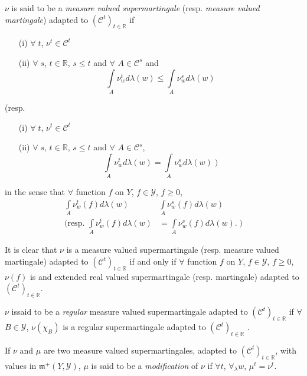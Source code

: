 \begin{defn}\label{part2:chap4:def68}
$\nu$ is said to be a {\em measure valued supermartingale} (resp. {\em
  measure valued martingale}) adapted to $(\mathscr{C}^t)_{t \in
    \mathbb{R}}$ if 
\begin{itemize}
\item[{\rm (i)}] $\forall \; t$, $\nu^t \in \mathscr{C}^t$

\item[{\rm (ii)}] $\forall \; s$, $t \in \mathbb{R}$, $s \leq t$ and
  $\forall$ $A \in \mathscr{C}^s$ and 
$$
\int\limits_A \nu^t_w d \lambda (w) \leq \int\limits_A \nu^s_w d \lambda(w)
$$
\end{itemize}
(resp.\begin{itemize}
\item[{\rm (i)}] $\forall \; t$, $\nu^t \in \mathscr{C}^t$

\item[{\rm (ii)}] $\forall \; s$, $t \in\mathbb{R}$, $s \leq t$ and
  $\forall$ $A \in \mathscr{C}^s$,
$$
\int\limits_A \nu^t_w d\lambda(w) = \int\limits_A \nu^s_w d\lambda(w)
\; )
$$
\end{itemize}
in the sense that $\forall$ function $f$ on $Y$, $f \in \mathscr{Y}$,
$f \geq 0$,
\begin{align*}
\int\limits_A \nu^t_w (f) d\lambda (w) & \int\limits_A \nu^s_w (f) d
\lambda(w)\\
(\text{resp. } \int\limits_A \nu^t_w (f) d\lambda(w) & = \int\limits_A
\nu^s_w (f) d\lambda (w). \; )
\end{align*}
\end{defn}

It is clear that $\nu$ is a measure valued supermartingale (resp.
measure valued martingale) adapted to
$(\mathscr{C}^t)_{t\in\mathbb{R}}$ if and only if $\forall$ function
$f$ on $Y$, $f \in \mathscr{Y}$, $f \geq 0$, $\nu(f)$ is and extended
real valued supermartingale (resp. martingale) adapted to
$(\mathscr{C}^t)_{t \in \mathbb{R}}$. 

\begin{defn}\label{part2:chap4:def69}
$\nu$ is\pageoriginale said to be a {\em regular} measure valued supermartingale
  adapted to $(\mathscr{C}^t)_{t \in \mathbb{R}}$ if $\forall$ $B \in
  \mathscr{Y}$, $\nu(\chi_B)$ is a regular supermartingale adapted to
  $(\mathscr{C}^t)_{t \in \mathbb{R}}$ . 
 \end{defn}

\begin{defn}\label{part2:chap4:def70}
If $\nu$ and $\mu$ are two measure valued supermartingales, adapted to
$(\mathscr{C}^t)_{t \in \mathbb{R}}$, with values in $\mathfrak{m}^+
(Y, \mathscr{Y})$, $\mu$ is said to be a {\em modification} of $\nu$
if $\forall t$, $\forall_\lambda w$, $\mu^t = \nu^t$. 
\end{defn}

